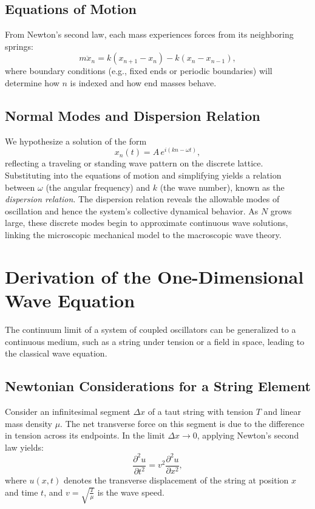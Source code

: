 \documentclass{article}
\begin{document}
\subsection{Equations of Motion}
From Newton's second law, each mass experiences forces from its neighboring springs:
\begin{equation}
    m\ddot{x}_n = k (x_{n+1} - x_n) - k (x_n - x_{n-1}),
\end{equation}
where boundary conditions (e.g., fixed ends or periodic boundaries) will determine how $n$ is indexed and how end masses behave.

\subsection{Normal Modes and Dispersion Relation}
We hypothesize a solution of the form
\begin{equation}
    x_n(t) = A\, e^{i (k n - \omega t)},
\end{equation}
reflecting a traveling or standing wave pattern on the discrete lattice. Substituting into the equations of motion and simplifying yields a relation between $\omega$ (the angular frequency) and $k$ (the wave number), known as the \emph{dispersion relation}. The dispersion relation reveals the allowable modes of oscillation and hence the system's collective dynamical behavior. As $N$ grows large, these discrete modes begin to approximate continuous wave solutions, linking the microscopic mechanical model to the macroscopic wave theory.

\section{Derivation of the One-Dimensional Wave Equation}
The continuum limit of a system of coupled oscillators can be generalized to a continuous medium, such as a string under tension or a field in space, leading to the classical wave equation.

\subsection{Newtonian Considerations for a String Element}
Consider an infinitesimal segment $\Delta x$ of a taut string with tension $T$ and linear mass density $\mu$. The net transverse force on this segment is due to the difference in tension across its endpoints. In the limit $\Delta x \to 0$, applying Newton's second law yields:
\begin{equation}
    \frac{\partial^2 u}{\partial t^2} = v^2 \frac{\partial^2 u}{\partial x^2},
\end{equation}
where $u(x,t)$ denotes the transverse displacement of the string at position $x$ and time $t$, and $v = \sqrt{\frac{T}{\mu}}$ is the wave speed.
\end{document}
